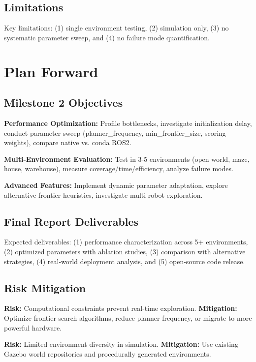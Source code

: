 \documentclass[conference]{IEEEtran}
\begin{document}
\subsection{Limitations}

Key limitations: (1) single environment testing, (2) simulation only, (3) no systematic parameter sweep, and (4) no failure mode quantification.

\section{Plan Forward}

\subsection{Milestone 2 Objectives}

\textbf{Performance Optimization:} Profile bottlenecks, investigate initialization delay, conduct parameter sweep (planner\_frequency, min\_frontier\_size, scoring weights), compare native vs. conda ROS2.

\textbf{Multi-Environment Evaluation:} Test in 3-5 environments (open world, maze, house, warehouse), measure coverage/time/efficiency, analyze failure modes.

\textbf{Advanced Features:} Implement dynamic parameter adaptation, explore alternative frontier heuristics, investigate multi-robot exploration.

\subsection{Final Report Deliverables}

Expected deliverables: (1) performance characterization across 5+ environments, (2) optimized parameters with ablation studies, (3) comparison with alternative strategies, (4) real-world deployment analysis, and (5) open-source code release.

\subsection{Risk Mitigation}

\textbf{Risk:} Computational constraints prevent real-time exploration. \textbf{Mitigation:} Optimize frontier search algorithms, reduce planner frequency, or migrate to more powerful hardware.

\textbf{Risk:} Limited environment diversity in simulation. \textbf{Mitigation:} Use existing Gazebo world repositories and procedurally generated environments.
\end{document}
